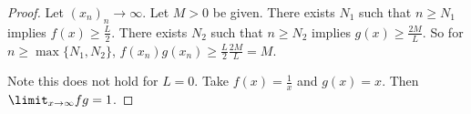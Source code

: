 \documentclass[11pt,twoside,openany]{memoir}
\begin{document}
        \begin{proof}
            Let $(x_n)_n \rightarrow \infty$. Let $M >  0$ be given. There exists $N_1$ such that $n \geq N_1$ implies $f(x) \geq \frac{L}{2}$. There exists $N_2$ such that $n \geq N_2$ implies $g(x) \geq \frac{2M}{L}$. So for $n \geq \max\{N_1,N_2\}$, $f(x_n)g(x_n) \geq \frac{L}{2} \frac{2M}{L} = M$. \nl
            
            Note this does not hold for $L=0$. Take $f(x) = \frac{1}{x}$ and $g(x) = x$. Then $\limit_{x \rightarrow \infty}fg = 1$.
            
        \end{proof}
\end{document}
